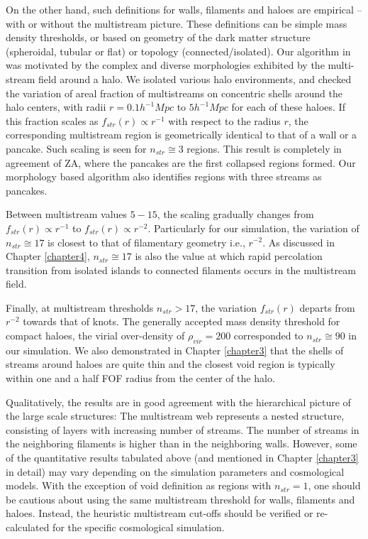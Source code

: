 On the other hand, such definitions for walls, filaments and haloes are empirical -- with or without the multistream picture. These definitions can be simple mass density thresholds, or based on geometry of the dark matter structure (spheroidal, tubular or flat) or topology (connected/isolated). Our algorithm in \cite{Ramachandra2015} was motivated by the complex and diverse morphologies exhibited by the multi-stream field around a halo. We isolated various halo environments, and checked the variation of areal fraction of multistreams on concentric shells around the halo centers, with radii $r = 0.1 h^{-1} Mpc$ to $5 h^{-1} Mpc$ for each of these haloes. If this fraction scales as $f_{str}(r) \propto r^{-1}$ with respect to the radius $r$, the corresponding multistream region is geometrically identical to that of a wall or a pancake. Such scaling is seen for $n_{str} \cong 3$ regions. This result is completely in agreement of ZA, where the pancakes are the first collapsed regions formed. Our morphology based algorithm also identifies regions with three streams as pancakes.  

Between multistream values $5-15$, the scaling gradually changes from $f_{str}(r) \propto r^{-1}$ to $f_{str}(r) \propto r^{-2}$. Particularly for our simulation, the variation of $n_{str} \cong 17$ is closest to that of filamentary geometry i.e., $r^{-2}$. As discussed in Chapter \ref{chapter4}, $n_{str} \cong 17$ is also the value at which rapid percolation transition from isolated islands to connected filaments occurs in the multistream field. 

Finally, at multistream thresholds $n_{str} > 17$, the variation $f_{str}(r)$ departs from $r^{-2}$ towards that of knots. The generally accepted mass density threshold for compact haloes, the virial over-density of $\rho_{vir} = 200$ corresponded to $n_{str} \cong 90 $ in our simulation. We also demonstrated in Chapter \ref{chapter3} that the shells of streams around haloes are quite thin and the closest void region is typically within one and a half FOF radius from the center of the halo. 

Qualitatively, the results are in good agreement with the hierarchical picture of the large scale structures: The multistream web represents a nested structure, consisting of layers with increasing number of streams. The number of streams in the neighboring filaments is higher than in the neighboring walls. However, some of the quantitative results tabulated above (and mentioned in Chapter \ref{chapter3} in detail) may vary depending on the simulation parameters and cosmological models. With the exception of void definition as regions with $n_{str} = 1$, one should be cautious about using the same multistream threshold for walls, filaments and haloes. Instead, the heuristic multistream cut-offs should be verified or re-calculated for the specific cosmological simulation. 


